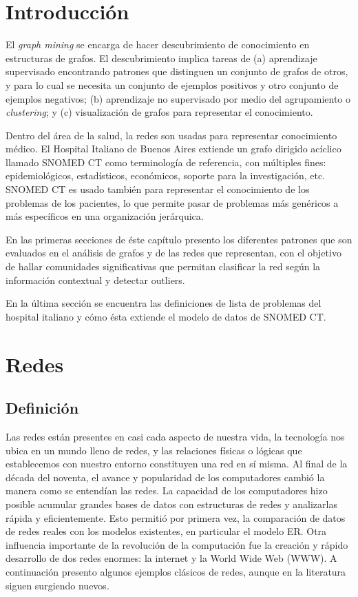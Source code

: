 \section{Introducción}
El \textit{graph mining} se encarga de hacer descubrimiento de conocimiento en estructuras de grafos. El descubrimiento implica tareas de (a) aprendizaje supervisado encontrando patrones que distinguen un conjunto de grafos de otros, y para lo cual se necesita un conjunto de ejemplos positivos y otro conjunto de ejemplos negativos; (b) aprendizaje no supervisado por medio del agrupamiento o \textit{clustering}; y (c) visualización de grafos para representar el conocimiento.

Dentro del área de la salud, la redes son usadas para representar conocimiento médico. El Hospital Italiano de Buenos Aires extiende un grafo dirigido acíclico llamado SNOMED CT como terminología de referencia, con múltiples fines: epidemiológicos, estadísticos, económicos, soporte para la investigación, etc. SNOMED CT es usado también para representar el conocimiento de los problemas de los pacientes, lo que permite pasar de problemas más genéricos a más específicos en una organización jerárquica.

En las primeras secciones de éste capítulo presento los diferentes patrones que son evaluados en el análisis de grafos y de las redes que representan, con el objetivo de hallar comunidades significativas que permitan clasificar la red según la información contextual y detectar outliers.

En la última sección se encuentra las definiciones de lista de problemas del hospital italiano y cómo ésta extiende el modelo de datos de SNOMED CT.

\section{Redes}
\subsection{Definición}
Las redes están presentes en casi cada aspecto de nuestra vida, la tecnología nos ubica en un mundo lleno de redes, y las relaciones físicas o lógicas que establecemos con nuestro entorno constituyen una red en sí misma. Al final de la década del noventa, el avance y popularidad de los computadores cambió la manera como se entendían las redes. La capacidad de los computadores hizo posible acumular grandes bases de datos con estructuras de redes y analizarlas rápida y eficientemente. Esto permitió por primera vez, la comparación de datos de redes reales con los modelos existentes, en particular el modelo ER. Otra influencia importante de la revolución de la computación fue la creación y rápido desarrollo de dos redes enormes: la internet y la World Wide Web (WWW). A continuación presento algunos ejemplos clásicos de redes, aunque en la literatura siguen surgiendo nuevos.

